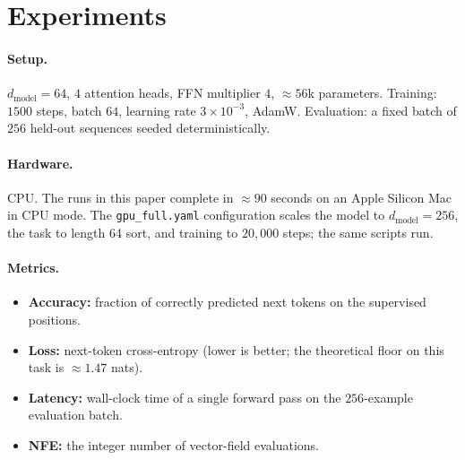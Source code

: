\section{Experiments}
\paragraph{Setup.} $d_{\text{model}}=64$, $4$ attention heads, FFN
multiplier $4$, $\approx 56$k parameters. Training: $1500$ steps,
batch $64$, learning rate $3\times 10^{-3}$, AdamW. Evaluation: a fixed
batch of $256$ held-out sequences seeded deterministically.

\paragraph{Hardware.} CPU. The runs in this paper complete in
$\approx 90$ seconds on an Apple Silicon Mac in CPU mode. The
\texttt{gpu\_full.yaml} configuration scales the model to
$d_{\text{model}}=256$, the task to length 64 sort, and training to
$20{,}000$ steps; the same scripts run.

\paragraph{Metrics.}
\begin{itemize}
\item \textbf{Accuracy:} fraction of correctly predicted next tokens
on the supervised positions.
\item \textbf{Loss:} next-token cross-entropy (lower is better;
the theoretical floor on this task is $\approx 1.47$ nats).
\item \textbf{Latency:} wall-clock time of a single forward pass on the
$256$-example evaluation batch.
\item \textbf{NFE:} the integer number of vector-field evaluations.
\end{itemize}

